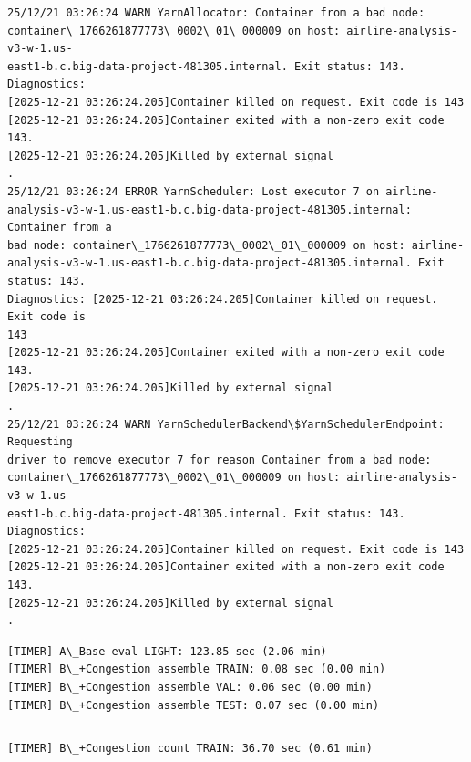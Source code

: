 \documentclass[11pt]{article}
\begin{document}
    \begin{Verbatim}[commandchars=\\\{\}]
25/12/21 03:26:24 WARN YarnAllocator: Container from a bad node:
container\_1766261877773\_0002\_01\_000009 on host: airline-analysis-v3-w-1.us-
east1-b.c.big-data-project-481305.internal. Exit status: 143. Diagnostics:
[2025-12-21 03:26:24.205]Container killed on request. Exit code is 143
[2025-12-21 03:26:24.205]Container exited with a non-zero exit code 143.
[2025-12-21 03:26:24.205]Killed by external signal
.
25/12/21 03:26:24 ERROR YarnScheduler: Lost executor 7 on airline-
analysis-v3-w-1.us-east1-b.c.big-data-project-481305.internal: Container from a
bad node: container\_1766261877773\_0002\_01\_000009 on host: airline-
analysis-v3-w-1.us-east1-b.c.big-data-project-481305.internal. Exit status: 143.
Diagnostics: [2025-12-21 03:26:24.205]Container killed on request. Exit code is
143
[2025-12-21 03:26:24.205]Container exited with a non-zero exit code 143.
[2025-12-21 03:26:24.205]Killed by external signal
.
25/12/21 03:26:24 WARN YarnSchedulerBackend\$YarnSchedulerEndpoint: Requesting
driver to remove executor 7 for reason Container from a bad node:
container\_1766261877773\_0002\_01\_000009 on host: airline-analysis-v3-w-1.us-
east1-b.c.big-data-project-481305.internal. Exit status: 143. Diagnostics:
[2025-12-21 03:26:24.205]Container killed on request. Exit code is 143
[2025-12-21 03:26:24.205]Container exited with a non-zero exit code 143.
[2025-12-21 03:26:24.205]Killed by external signal
.
    \end{Verbatim}

    \begin{Verbatim}[commandchars=\\\{\}]
[TIMER] A\_Base eval LIGHT: 123.85 sec (2.06 min)
[TIMER] B\_+Congestion assemble TRAIN: 0.08 sec (0.00 min)
[TIMER] B\_+Congestion assemble VAL: 0.06 sec (0.00 min)
[TIMER] B\_+Congestion assemble TEST: 0.07 sec (0.00 min)
    \end{Verbatim}

    \begin{Verbatim}[commandchars=\\\{\}]

    \end{Verbatim}

    \begin{Verbatim}[commandchars=\\\{\}]
[TIMER] B\_+Congestion count TRAIN: 36.70 sec (0.61 min)
    \end{Verbatim}
\end{document}
